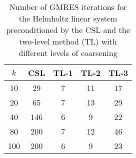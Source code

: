 \begin{table}[t]
\centering
\begin{tabular}{ccccc}
\hline
$k$ & CSL & TL-1 & TL-2 & TL-3 \\ \hline
10 & 29 & 7 & 11 & 17 \\
20 & 65 & 7 & 13 & 29 \\
40 & 146 & 6 & 9 & 22 \\
80 & 200 & 7 & 12 & 46 \\
100 & 200 & 6 & 9 & 23 \\
\hline
\end{tabular}
\caption{Number of GMRES iterations for the Helmholtz linear system preconditioned by the  CSL and the two-level method (TL) with different levels of coarsening}
\label{table:gmres_csl_vs_adef_coarse_eps_50}
\end{table}
